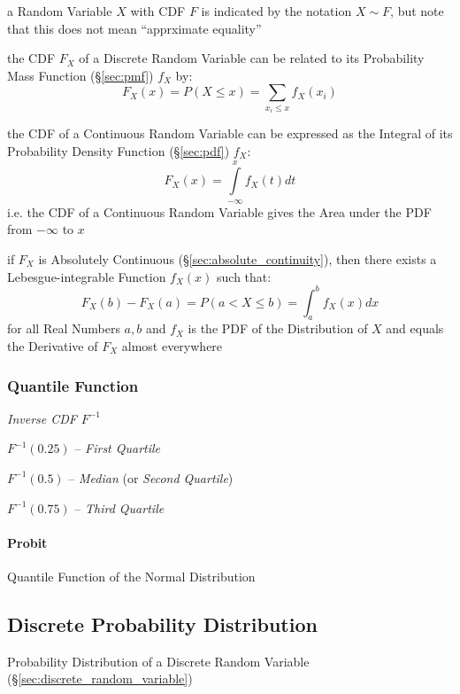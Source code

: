 a Random Variable $X$ with CDF $F$ is indicated by the notation $X \sim F$, but
note that this does not mean ``apprximate equality''

the CDF $F_X$ of a Discrete Random Variable can be related to its Probability
Mass Function (\S\ref{sec:pmf}) $f_X$ by:
\[
  F_X(x) = P(X \leq x) = \sum_{x_i \leq x} f_X(x_i)
\]

the CDF of a Continuous Random Variable can be expressed as the Integral of its
Probability Density Function (\S\ref{sec:pdf}) $f_X$:
\[
  F_X(x) = \int\limits_{-\infty}^x f_X(t) dt
\]
i.e. the CDF of a Continuous Random Variable gives the Area under the PDF from
$-\infty$ to $x$

if $F_X$ is Absolutely Continuous (\S\ref{sec:absolute_continuity}), then there
exists a Lebesgue-integrable Function $f_X(x)$ such that:
\[
  F_X(b) - F_X(a) = P(a < X \leq b) = \int_a^b f_X(x) dx
\]
for all Real Numbers $a, b$ and $f_X$ is the PDF of the Distribution of $X$
and equals the Derivative of $F_X$ almost everywhere



\subsubsection{Quantile Function}\label{sec:quantile_function}

\emph{Inverse CDF} $F^{-1}$

$F^{-1}(0.25)$ -- \emph{First Quartile}

$F^{-1}(0.5)$ -- \emph{Median} (or \emph{Second Quartile})

$F^{-1}(0.75)$ -- \emph{Third Quartile}



\paragraph{Probit}\label{sec:probit}\hfill

Quantile Function of the Normal Distribution



\subsection{Discrete Probability Distribution}
\label{sec:discrete_probability}

Probability Distribution of a Discrete Random Variable
(\S\ref{sec:discrete_random_variable})

